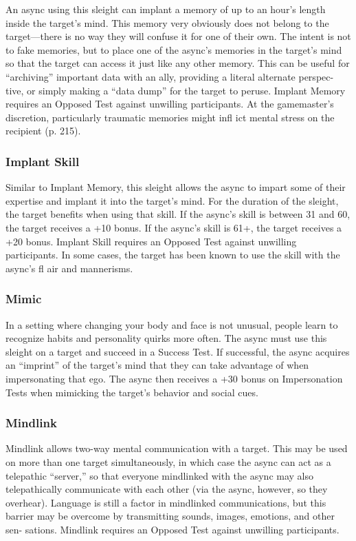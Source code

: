 An async using this sleight can implant a memory 
of up to an hour's length inside the target's mind. 
This memory very obviously does not belong to the 
target—there is no way they will confuse it for one 
of their own. The intent is not to fake memories, but 
to place one of the async's memories in the target's 
mind so that the target can access it just like any other 
memory. This can be useful for ``archiving'' important 
data with an ally, providing a literal alternate perspec-
tive, or simply making a ``data dump'' for the target 
to peruse. Implant Memory requires an Opposed Test 
against unwilling participants. At the gamemaster's 
discretion, particularly traumatic memories might 
infl ict mental stress on the recipient (p. 215).

\subsubsection{Implant Skill}

Similar to Implant Memory, this sleight allows the 
async to impart some of their expertise and implant it 
into the target's mind. For the duration of the sleight, 
the target benefits when using that skill. If the async's 
skill is between 31 and 60, the target receives a +10 
bonus. If the async's skill is 61+, the target receives 
a +20 bonus. Implant Skill requires an Opposed Test 
against unwilling participants. In some cases, the 
target has been known to use the skill with the async's 
fl air and mannerisms.

\subsubsection{Mimic}

In a setting where changing your body and face is 
not unusual, people learn to recognize habits and 
personality quirks more often. The async must use 
this sleight on a target and succeed in a Success Test. 
If successful, the async acquires an ``imprint'' of the 
target's mind that they can take advantage of when 
impersonating that ego. The async then receives a +30 
bonus on Impersonation Tests when mimicking the 
target's behavior and social cues.

\subsubsection{Mindlink}

Mindlink allows two-way mental communication 
with a target. This may be used on more than one 
target simultaneously, in which case the async can act 
as a telepathic ``server,'' so that everyone mindlinked 
with the async may also telepathically communicate 
with each other (via the async, however, so they 
overhear). Language is still a factor in mindlinked 
communications, but this barrier may be overcome by 
transmitting sounds, images, emotions, and other sen-
sations. Mindlink requires an Opposed Test against 
unwilling participants.

